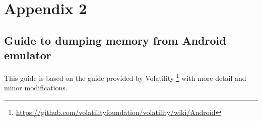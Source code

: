 \newcommand*\justify{%
  \fontdimen2\font=0.4em%
  \fontdimen3\font=0.2em%
  \fontdimen4\font=0.1em%
  \fontdimen7\font=0.1em%
  \hyphenchar\font=`\-%
}

\section{Appendix 2}
\subsection{Guide to dumping memory from Android emulator}\label{guide}
  This guide is based on the guide provided by Volatility \footnote{\url{https://github.com/volatilityfoundation/volatility/wiki/Android}} 
  with more detail and minor modifications.\\
  
